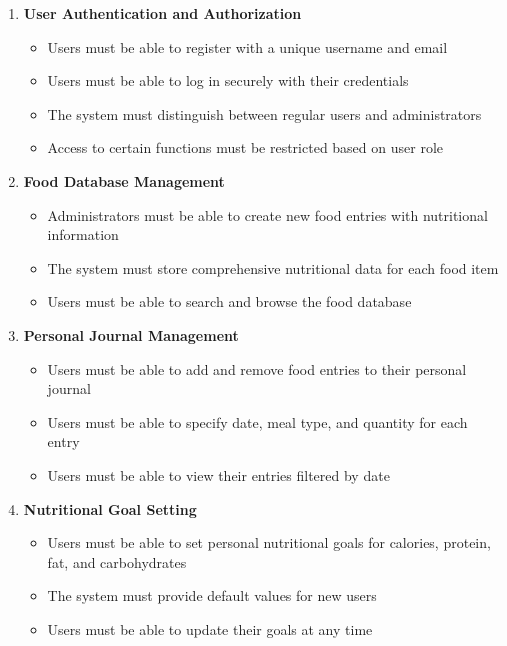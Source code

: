 \documentclass[a4paper,10pt]{article}
\begin{document}
    \begin{enumerate}
        \item \textbf{User Authentication and Authorization}
        \begin{itemize}
            \item Users must be able to register with a unique username and email
            \item Users must be able to log in securely with their credentials
            \item The system must distinguish between regular users and administrators
            \item Access to certain functions must be restricted based on user role
        \end{itemize}

        \item \textbf{Food Database Management}
        \begin{itemize}
            \item Administrators must be able to create new food entries with nutritional information
            \item The system must store comprehensive nutritional data for each food item
            \item Users must be able to search and browse the food database
        \end{itemize}

        \item \textbf{Personal Journal Management}
        \begin{itemize}
            \item Users must be able to add and remove food entries to their personal journal
            \item Users must be able to specify date, meal type, and quantity for each entry
            \item Users must be able to view their entries filtered by date
        \end{itemize}

        \item \textbf{Nutritional Goal Setting}
        \begin{itemize}
            \item Users must be able to set personal nutritional goals for calories, protein, fat, and carbohydrates
            \item The system must provide default values for new users
            \item Users must be able to update their goals at any time
        \end{itemize}


\end{enumerate}
\end{document}
